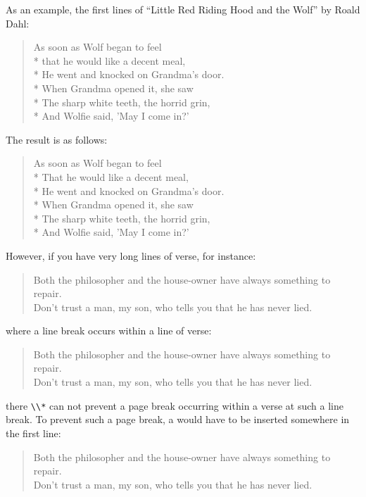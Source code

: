 \begin{Example}
  \label{desc:maincls.env.verse.example}%
  As an example, the first lines of ``Little Red Riding Hood and the
  Wolf'' by Roald Dahl:
\begin{lstcode}
  \begin{verse}
    As soon as Wolf began to feel\\*
    that he would like a decent meal,\\*
    He went and knocked on Grandma's door.\\*
    When Grandma opened it, she saw\\*
    The sharp white teeth, the horrid grin,\\*
    And Wolfie said, 'May I come in?'
  \end{verse}
\end{lstcode}
  The result is as follows:
  \begin{ShowOutput}
  \begin{verse}
    As soon as Wolf began to feel\\*
    That he would like a decent meal,\\*
    He went and knocked on Grandma's door.\\*
    When Grandma opened it, she saw\\*
    The sharp white teeth, the horrid grin,\\*
    And Wolfie said, 'May I come in?'
  \end{verse}
  \end{ShowOutput}
  However, if you have very long lines of verse, for instance:
\begin{lstcode}
  \begin{verse}
    Both the philosopher and the house-owner
    have always something to repair.\\
    \bigskip
    Don't trust a man, my son, who tells you
    that he has never lied.
  \end{verse}
\end{lstcode}
  where a line break occurs within a line of verse:
\begin{ShowOutput}
  \begin{verse}
    Both the philosopher and the house-owner
    have always something to repair.\\
    \bigskip
    Don't trust a man, my son, who tells you
    that he has never lied.
  \end{verse}
\end{ShowOutput}
  there \verb|\\*| can not prevent a page break occurring within a verse
  at such a line break. To prevent such a page break, a
   would have to be inserted
  somewhere in the first line:
\begin{lstcode}
  \begin{verse}
    Both the philosopher and the house-owner\nopagebreak
    have always something to repair.\\
    \bigskip
    Don't trust a man, my son, who tells you\nopagebreak
    that he has never lied.
  \end{verse}
\end{lstcode}


\end{Example}
